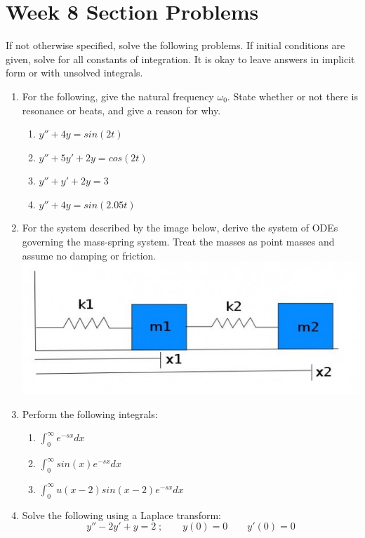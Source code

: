 \documentclass[letterpaper, fontsize=11pt]{scrartcl} %
\numberwithin{equation}{section} %
\numberwithin{figure}{section} %
\numberwithin{table}{section} %
\begin{document}

\newcommand{\horrule}[1]{\rule{\linewidth}{#1}} %


\section*{Week 8 Section Problems}
\par If not otherwise specified, solve the following problems. If initial conditions are given, solve for all constants of integration. It is okay to leave answers in implicit form or with unsolved integrals. 
\begin{enumerate}
\item For the following, give the natural frequency \textit{$\omega_0$}. State whether or not there is resonance or beats, and give a reason for why.
\begin{enumerate}
\item $y'' + 4y = sin(2t)$
\item $y'' + 5y' + 2y = cos(2t)$
\item $y'' + y' + 2y = 3$
\item $y'' + 4y = sin(2.05t)$
\end{enumerate}

\item For the system described by the image below, derive the system of ODEs governing the mass-spring system. Treat the masses as point masses and assume no damping or friction.
\newline
\includegraphics[width=5in]{section8_1.jpg}

\item Perform the following integrals:
\begin{enumerate}
\item $\int_{0}^{\infty}e^{-sx} dx$
\item $\int_{0}^{\infty}sin(x)e^{-sx} dx$
\item $\int_{0}^{\infty}u(x-2)sin(x-2)e^{-sx} dx$
\end{enumerate}

\item Solve the following using a Laplace transform: $$y'' - 2y' + y = 2 \; ; \qquad y(0) = 0 \qquad y'(0) = 0$$


\end{enumerate}

\end{document}
